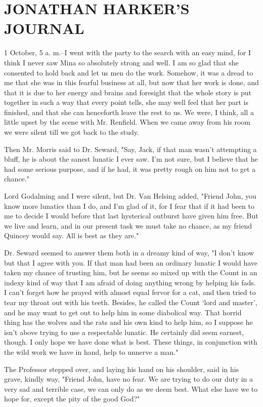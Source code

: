 \chapter{JONATHAN HARKER'S JOURNAL}

1 October, 5 a. m.--I went with the party to the search with an easy mind, for I think I never saw Mina so absolutely strong and well. I am so glad that she consented to hold back and let us men do the work. Somehow, it was a dread to me that she was in this fearful business at all, but now that her work is done, and that it is due to her energy and brains and foresight that the whole story is put together in such a way that every point tells, she may well feel that her part is finished, and that she can henceforth leave the rest to us. We were, I think, all a little upset by the scene with Mr. Renfield. When we came away from his room we were silent till we got back to the study. 

Then Mr. Morris said to Dr. Seward, "Say, Jack, if that man wasn't attempting a bluff, he is about the sanest lunatic I ever saw. I'm not sure, but I believe that he had some serious purpose, and if he had, it was pretty rough on him not to get a chance." 

Lord Godalming and I were silent, but Dr. Van Helsing added, "Friend John, you know more lunatics than I do, and I'm glad of it, for I fear that if it had been to me to decide I would before that last hysterical outburst have given him free. But we live and learn, and in our present task we must take no chance, as my friend Quincey would say. All is best as they are." 

Dr. Seward seemed to answer them both in a dreamy kind of way, "I don't know but that I agree with you. If that man had been an ordinary lunatic I would have taken my chance of trusting him, but he seems so mixed up with the Count in an indexy kind of way that I am afraid of doing anything wrong by helping his fads. I can't forget how he prayed with almost equal fervor for a cat, and then tried to tear my throat out with his teeth. Besides, he called the Count `lord and master', and he may want to get out to help him in some diabolical way. That horrid thing has the wolves and the rats and his own kind to help him, so I suppose he isn't above trying to use a respectable lunatic. He certainly did seem earnest, though. I only hope we have done what is best. These things, in conjunction with the wild work we have in hand, help to unnerve a man." 

The Professor stepped over, and laying his hand on his shoulder, said in his grave, kindly way, "Friend John, have no fear. We are trying to do our duty in a very sad and terrible case, we can only do as we deem best. What else have we to hope for, except the pity of the good God?" 

